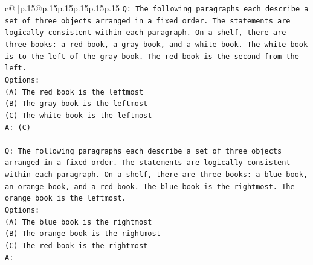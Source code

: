 \documentclass{article}
\begin{document}
{\begin{supertabular}{c@{$\;$}|p{.15\linewidth}@{}p{.15\linewidth}p{.15\linewidth}p{.15\linewidth}p{.15\linewidth}p{.15\linewidth}}
{{{\texttt{Q: The following paragraphs each describe a set of three objects arranged in a fixed order. The statements are logically consistent within each paragraph. On a shelf, there are three books: a red book, a gray book, and a white book. The white book is to the left of the gray book. The red book is the second from the left.} \\
\texttt{Options:} \\
\texttt{(A) The red book is the leftmost} \\
\texttt{(B) The gray book is the leftmost} \\
\texttt{(C) The white book is the leftmost} \\
\texttt{A: (C)} \\
\\ 
\texttt{Q: The following paragraphs each describe a set of three objects arranged in a fixed order. The statements are logically consistent within each paragraph. On a shelf, there are three books: a blue book, an orange book, and a red book. The blue book is the rightmost. The orange book is the leftmost.} \\
\texttt{Options:} \\
\texttt{(A) The blue book is the rightmost} \\
\texttt{(B) The orange book is the rightmost} \\
\texttt{(C) The red book is the rightmost} \\
\texttt{A:} \\
            }
        }
    }
     \\ \\


\end{supertabular}}
\end{document}
